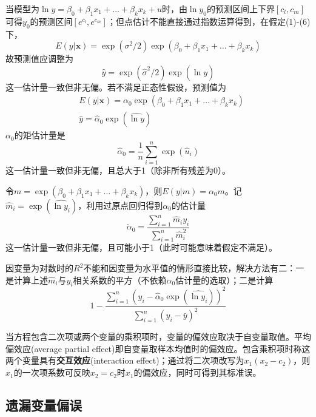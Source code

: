 \par 当模型为$\ln y=\beta_0+\beta_1 x_1+\dots+\beta_k x_k+u$时，由$\ln y_0$的预测区间上下界$[c_l,c_m]$可得$y_0$的预测区间$[e^{c_l},e^{c_m}]$；但点估计不能直接通过指数运算得到，在假定(1)-(6)下，
\begin{equation}
    E(y\vert \mathbf{x})=\exp(\sigma^2/2)\exp(\beta_0+\beta_1 x_1+\dots+\beta_k x_k)
\end{equation}
故预测值应调整为
\begin{equation}
    \hat{y}=\exp(\hat{\sigma}^2/2)\exp( \hat{\ln y})
\end{equation}
这一估计量一致但非无偏。若不满足正态性假设，预测值为
\begin{align}
&E(y\vert \mathbf{x})=\alpha_0\exp(\beta_0+\beta_1 x_1+\dots+\beta_k x_k)\\
&\hat{y}=\hat{\alpha}_0\exp( \hat{\ln y})
\end{align}
$\alpha_0$的矩估计量是
\begin{equation}
    \hat{\alpha}_0=\frac{1}{n}\sum_{i=1}^n \exp(\hat{u}_i)
\end{equation}
这一估计量一致但非无偏，且总大于1（除非所有残差为0）。
\par 令$m=\exp(\beta_0+\beta_1 x_1+\dots+\beta_k x_k)$，则$E(y\vert m)=\alpha_0 m$。记$\hat{m}_i=\exp (\hat{\ln y_i})$，利用过原点回归得到$\alpha_0$的估计量
\begin{equation}
    \check{\alpha}_0=\frac{\sum_{i=1}^n \hat{m}_i y_i}{\sum_{i=1}^n \hat{m}_i^2}
\end{equation}
这一估计量一致但非无偏，且可能小于1（此时可能意味着假定不满足）。
\par 因变量为对数时的$R^2$不能和因变量为水平值的情形直接比较，解决方法有二：一是计算上述$\hat{m}_i$与$y_i$相关系数的平方（不依赖$\alpha_0$估计量的选取）；二是计算
\begin{equation}
    1-\frac{\sum_{i=1}^n(y_i-\hat{\alpha}_0\exp(\hat{\ln y_i}))^2}{\sum_{i=1}^n(y_i-\bar{y})^2}
\end{equation}

\par 当方程包含二次项或两个变量的乘积项时，变量的偏效应取决于自变量取值。平均偏效应(average partial effect)即自变量取样本均值时的偏效应。包含乘积项时称这两个变量具有\textbf{交互效应}(interaction effect)；通过将二次项改写为$x_1(x_2-c_2)$，则$x_1$的一次项系数可反映$x_2=c_2$时$x_1$的偏效应，同时可得到其标准误。

\subsection{遗漏变量偏误}

